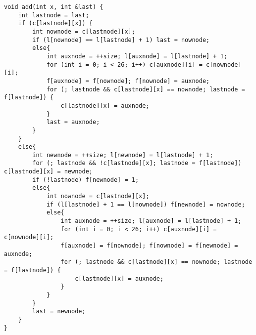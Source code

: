 \begin{lstlisting}
void add(int x, int &last) {
	int lastnode = last;
	if (c[lastnode][x]) {
		int nownode = c[lastnode][x];
		if (l[nownode] == l[lastnode] + 1) last = nownode;
		else{
			int auxnode = ++size; l[auxnode] = l[lastnode] + 1;
			for (int i = 0; i < 26; i++) c[auxnode][i] = c[nownode][i];
			f[auxnode] = f[nownode]; f[nownode] = auxnode;
			for (; lastnode && c[lastnode][x] == nownode; lastnode = f[lastnode]) {
				c[lastnode][x] = auxnode;
			}
			last = auxnode;
		}
	}
	else{
		int newnode = ++size; l[newnode] = l[lastnode] + 1;
		for (; lastnode && !c[lastnode][x]; lastnode = f[lastnode]) c[lastnode][x] = newnode;
		if (!lastnode) f[newnode] = 1;
		else{
			int nownode = c[lastnode][x];
			if (l[lastnode] + 1 == l[nownode]) f[newnode] = nownode;
			else{
				int auxnode = ++size; l[auxnode] = l[lastnode] + 1;
				for (int i = 0; i < 26; i++) c[auxnode][i] = c[nownode][i];
				f[auxnode] = f[nownode]; f[nownode] = f[newnode] = auxnode;
				for (; lastnode && c[lastnode][x] == nownode; lastnode = f[lastnode]) {
					c[lastnode][x] = auxnode;
				}
			}
		}
		last = newnode;
	}
}
\end{lstlisting}
